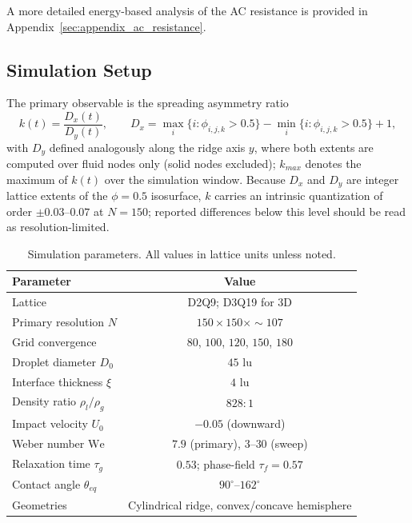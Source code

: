 A more detailed energy-based analysis of the AC resistance is provided in Appendix~\ref{sec:appendix_ac_resistance}.

\subsection{Simulation Setup}

The primary observable is the spreading asymmetry ratio
\begin{equation}\label{eq:k_definition}
    k(t) = \frac{D_x(t)}{D_y(t)}, \qquad
    D_x = \max_i\{i : \phi_{i,j,k}>0.5\} - \min_i\{i : \phi_{i,j,k}>0.5\} + 1,
\end{equation}
with $D_y$ defined analogously along the ridge axis $y$, where both extents are computed over fluid nodes only (solid nodes excluded); $k_{max}$ denotes the maximum of $k(t)$ over the simulation window. Because $D_x$ and $D_y$ are integer lattice extents of the $\phi=0.5$ isosurface, $k$ carries an intrinsic quantization of order $\pm 0.03$--$0.07$ at $N=150$; reported differences below this level should be read as resolution-limited.

\begin{table}[htbp]
\centering
\caption{Simulation parameters. All values in lattice units unless noted.}
\label{tab:sim_params}
\begin{tabular}{lc}
\hline
Parameter & Value \\
\hline
Lattice & D2Q9; D3Q19 for 3D \\
Primary resolution $N$ & $150 \times 150 \times \sim 107$ \\
Grid convergence & $80$, $100$, $120$, $150$, $180$ \\
Droplet diameter $D_0$ & $45$ lu \\
Interface thickness $\xi$ & $4$ lu \\
Density ratio $\rho_l/\rho_g$ & $828:1$ \\
Impact velocity $U_0$ & $-0.05$ (downward) \\
Weber number $\mathrm{We}$ & $7.9$ (primary), $3$--$30$ (sweep) \\
Relaxation time $\tau_g$ & $0.53$; phase-field $\tau_f = 0.57$ \\
Contact angle $\theta_{eq}$ & $90^\circ$--$162^\circ$ \\
Geometries & Cylindrical ridge, convex/concave hemisphere \\
\hline
\end{tabular}
\end{table}

